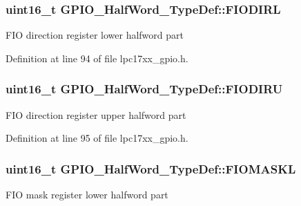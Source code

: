\hypertarget{struct_g_p_i_o___half_word___type_def_a732c0e3c24cd74b2816c3bb1cce7601b}{
\subsubsection[{\-F\-I\-O\-D\-I\-R\-L}]{ uint16\-\_\-t {\bf \-G\-P\-I\-O\-\_\-\-Half\-Word\-\_\-\-Type\-Def\-::\-F\-I\-O\-D\-I\-R\-L}}}\label{struct_g_p_i_o___half_word___type_def_a732c0e3c24cd74b2816c3bb1cce7601b}
\-F\-I\-O direction register lower halfword part 

\-Definition at line 94 of file lpc17xx\-\_\-gpio.\-h.

\hypertarget{struct_g_p_i_o___half_word___type_def_a745fc05548a5c8e0e2b862ca01634889}{
\subsubsection[{\-F\-I\-O\-D\-I\-R\-U}]{ uint16\-\_\-t {\bf \-G\-P\-I\-O\-\_\-\-Half\-Word\-\_\-\-Type\-Def\-::\-F\-I\-O\-D\-I\-R\-U}}}\label{struct_g_p_i_o___half_word___type_def_a745fc05548a5c8e0e2b862ca01634889}
\-F\-I\-O direction register upper halfword part 

\-Definition at line 95 of file lpc17xx\-\_\-gpio.\-h.

\hypertarget{struct_g_p_i_o___half_word___type_def_aa0d985ad5ef944c6152758d28ff18d76}{
\subsubsection[{\-F\-I\-O\-M\-A\-S\-K\-L}]{ uint16\-\_\-t {\bf \-G\-P\-I\-O\-\_\-\-Half\-Word\-\_\-\-Type\-Def\-::\-F\-I\-O\-M\-A\-S\-K\-L}}}\label{struct_g_p_i_o___half_word___type_def_aa0d985ad5ef944c6152758d28ff18d76}
\-F\-I\-O mask register lower halfword part 

